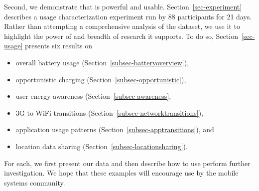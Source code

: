 

Second, we demonstrate that \PhoneLab{} is powerful and usable.
Section~\ref{sec-experiment} describes a usage characterization experiment
run by 88 \PhoneLab{} participants for 21 days. Rather than attempting a
comprehensive analysis of the dataset, we use it to highlight the power of
\PhoneLab{} and breadth of research it supports. To do so,
Section~\ref{sec-usage} presents six results on

\begin{itemize}[nosep]
\vspace*{0.08in}
\item overall battery usage (Section~\ref{subsec-batteryoverview}),
\item opportunistic charging (Section~\ref{subsec-opportunistic}),
\item user energy awareness (Section~\ref{subsec-awareness},
\item 3G to WiFi transitions (Section~\ref{subsec-networktransitions}),
\item application usage patterns (Section~\ref{subsec-apptransitions}), and
\item location data sharing (Section~\ref{subsec-locationsharing}).
\vspace*{0.08in}
\end{itemize}

For each, we first present our data and then describe how to use \PhoneLab{}
perform further investigation. We hope that these examples will encourage
\PhoneLab{} use by the mobile systems community.
